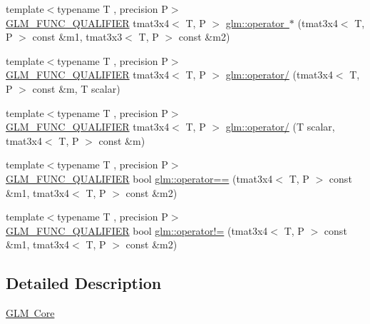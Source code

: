 \begin{DoxyCompactItemize}
\item 
{\footnotesize template$<$typename T , precision P$>$ }\\\mbox{\hyperlink{setup_8hpp_a33fdea6f91c5f834105f7415e2a64407}{G\+L\+M\+\_\+\+F\+U\+N\+C\+\_\+\+Q\+U\+A\+L\+I\+F\+I\+ER}} tmat3x4$<$ T, P $>$ \mbox{\hyperlink{namespaceglm_ad0b785fbe7ee56cca47821a8f12cfc52}{glm\+::operator $\ast$}} (tmat3x4$<$ T, P $>$ const \&m1, tmat3x3$<$ T, P $>$ const \&m2)
\item 
{\footnotesize template$<$typename T , precision P$>$ }\\\mbox{\hyperlink{setup_8hpp_a33fdea6f91c5f834105f7415e2a64407}{G\+L\+M\+\_\+\+F\+U\+N\+C\+\_\+\+Q\+U\+A\+L\+I\+F\+I\+ER}} tmat3x4$<$ T, P $>$ \mbox{\hyperlink{namespaceglm_a2c00b14561d6fdfbcce059b1d354ddda}{glm\+::operator/}} (tmat3x4$<$ T, P $>$ const \&m, T scalar)
\item 
{\footnotesize template$<$typename T , precision P$>$ }\\\mbox{\hyperlink{setup_8hpp_a33fdea6f91c5f834105f7415e2a64407}{G\+L\+M\+\_\+\+F\+U\+N\+C\+\_\+\+Q\+U\+A\+L\+I\+F\+I\+ER}} tmat3x4$<$ T, P $>$ \mbox{\hyperlink{namespaceglm_abd6120fa3b2bc164f9278363543f7d1e}{glm\+::operator/}} (T scalar, tmat3x4$<$ T, P $>$ const \&m)
\item 
{\footnotesize template$<$typename T , precision P$>$ }\\\mbox{\hyperlink{setup_8hpp_a33fdea6f91c5f834105f7415e2a64407}{G\+L\+M\+\_\+\+F\+U\+N\+C\+\_\+\+Q\+U\+A\+L\+I\+F\+I\+ER}} bool \mbox{\hyperlink{namespaceglm_a6ce503e89acc786363ee712f65b845d4}{glm\+::operator==}} (tmat3x4$<$ T, P $>$ const \&m1, tmat3x4$<$ T, P $>$ const \&m2)
\item 
{\footnotesize template$<$typename T , precision P$>$ }\\\mbox{\hyperlink{setup_8hpp_a33fdea6f91c5f834105f7415e2a64407}{G\+L\+M\+\_\+\+F\+U\+N\+C\+\_\+\+Q\+U\+A\+L\+I\+F\+I\+ER}} bool \mbox{\hyperlink{namespaceglm_a39503545e324d1a4846ad10aee597a1e}{glm\+::operator!=}} (tmat3x4$<$ T, P $>$ const \&m1, tmat3x4$<$ T, P $>$ const \&m2)
\end{DoxyCompactItemize}


\subsection{Detailed Description}
\mbox{\hyperlink{group__core}{G\+LM Core}} 
